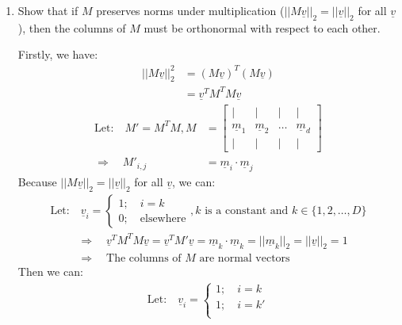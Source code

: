 \documentclass[11pt,letterpaper]{article}
\begin{document}
\begin{enumerate}
\item Show that if $M$ preserves norms under multiplication ($||M \underline v||_2 = ||\underline v||_2$ for all $\underline v$), then the columns of $M$ must be orthonormal with respect to each other.\\
\begin{flushleft}
    \justifying
    Firstly, we have:
    \begin{align*}
        ||M\underline v||_2^2 &= (M\underline v)^T(M\underline v)\\
        &= \underline v^T M^T M \underline v
    \end{align*}
    \begin{align*}
        \text{Let:} \quad M' = M^TM, M &= 
                    \begin{bmatrix}
                         | & | & | & | \\
                         \underline m_1 & \underline m_2 & \dots & \underline m_d\\
                         | & | & | & |
                    \end{bmatrix}\\
        \Rightarrow \quad M'_{i,j} &= \underline m_i \cdot \underline m_j 
    \end{align*}
    Because $||M \underline v||_2 = ||\underline v||_2$ for all $\underline v$, we can:
    \begin{align*}
        \text{Let:} \quad \underline v_i = 
        \begin{cases}
            1; \quad i=k \\
            0; \quad \text{elsewhere}
        \end{cases},  \text{$k$ is a constant and }k\in \{1,2,\dots,D\}
    \end{align*}
    \begin{align*}
        &\Rightarrow \quad \underline v^T M^T M \underline v = 
        \underline v^T M' \underline v 
        = \underline m_k \cdot \underline m_k
        = ||\underline m_k||_2
        = ||\underline v||_2 = 1\\
        &\Rightarrow \quad \text{The columns of $M$ are normal vectors}
    \end{align*}
    Then we can:
    \begin{align*}
        \text{Let:} \quad \underline v_i = 
        \begin{cases}
            1; \quad i=k \\
            1; \quad i=k'\\

\end{cases}
\end{align*}
\end{flushleft}
\end{enumerate}
\end{document}
